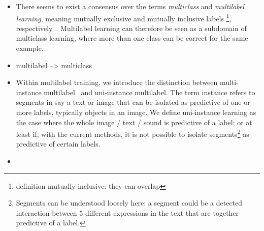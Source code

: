 \begin{itemize}[leftmargin=*]


\item {}

There seems to exist a consensus over the terms \emph{multiclass} and \emph{multilabel learning}, meaning mutually exclusive and mutually inclusive labels \footnote{definition mutually inclusive: they can overlap }, respectively~\cite{multilabelMethods}. Multilabel learning can therefore be seen as a subdomain of multiclass learning, where more than one class can be correct for the same example. 

\item {}


multilabel --> multiclass 


\item {}

Within multilabel training, we introduce the distinction between multi-instance multilabel~\citep[e.g.,][]{multiInstance, multiInstanceMultiLabel} and uni-instance multilabel. The term instance refers to segments in say a text or image that can be isolated as predictive of one or more labels, typically objects in an image. We define uni-instance learning as the case where the whole image / text / sound is predictive of a label; or at least if, with the current methods, it is not possible to isolate segments\footnote{Segments can be understood loosely here: a segment could be a detected interaction between 5 different expressions in the text that are together predictive of a label.} as predictive of certain labels.


\item {}
\end{itemize}



